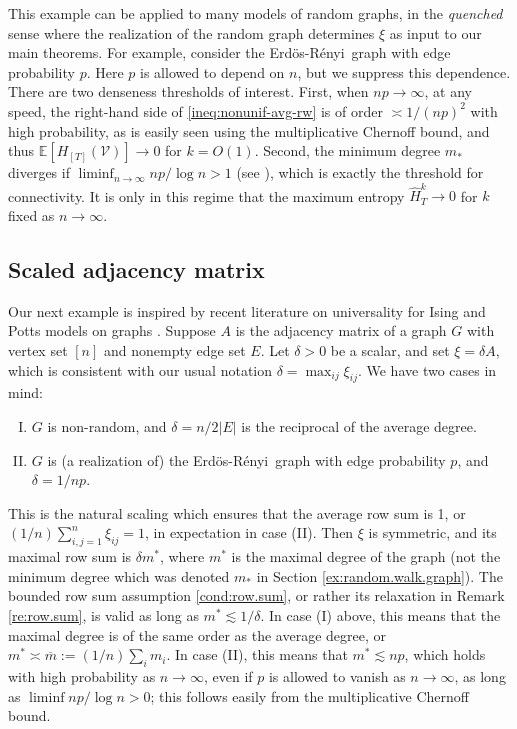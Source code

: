 \documentclass[11pt,reqno]{amsart}
\numberwithin{equation}{section}
\theoremstyle{definition}
\def\E{{\mathbb E}}
\def\V{{\mathcal V}}
\newcommand{\Erdos}{Erd\"{o}s-R\'enyi}
\begin{document}
This example can be applied to many models of random graphs, in the \emph{quenched} sense where the realization of the random graph determines $\xi$ as input to our main theorems.
For example, consider the \Erdos\ graph with edge probability $p$. Here $p$ is allowed to depend on $n$, but we suppress this dependence.
There are two denseness thresholds of interest. First, when $np\to\infty$, at any speed, the right-hand side of \eqref{ineq:nonunif-avg-rw} is of order $\asymp 1/(np)^2$ with high probability, as is easily seen using the multiplicative Chernoff bound, and thus  $ \E[H_{[T]}(\V)] \to 0$ for $k=O(1)$.
Second, the minimum degree $m_*$ diverges if  $\liminf_{n\to\infty} np/\log n > 1$ (see \cite[Lemma 6.5.2]{durrett2010random}), which is exactly the threshold for connectivity. It is only in this regime that the maximum entropy $\widehat{H}^k_T \to 0$ for $k$ fixed as $n\to\infty$. 



\subsection{Scaled adjacency matrix} \label{ex:AdjMatrix}
Our next example is inspired by recent literature on universality for Ising and Potts models on graphs \cite{basak2017universality}. Suppose $A$ is the adjacency matrix of a graph $G$ with vertex set $[n]$ and nonempty edge set $E$. Let $\delta > 0$ be a scalar, and set $\xi= \delta A$, which is consistent with our usual notation $ \delta = \max_{ij}\xi_{ij}$.
We have two cases in mind:
\begin{enumerate}[(I)]
\item $G$ is non-random, and $\delta=n/2|E|$ is the reciprocal of the average degree.
\item $G$ is (a realization of) the \Erdos\ graph with edge probability $p$, and $\delta = 1/np$.
\end{enumerate}
This is the natural scaling which ensures that the average row sum is 1, or $(1/n)\sum_{i,j=1}^n\xi_{ij}=1$, in expectation in case (II).
Then $\xi$ is symmetric, and its maximal row sum is $\delta m^*$, where $m^*$ is the maximal degree of the graph (not the minimum degree which was denoted $m_*$ in Section \ref{ex:random.walk.graph}).  The bounded row sum assumption \eqref{cond:row.sum}, or rather its relaxation in Remark \ref{re:row.sum}, is valid as long as $m^* \lesssim 1/\delta$. In case (I) above, this means that the maximal degree is of the same order as the average degree, or $m^* \asymp \overline{m} := (1/n)\sum_i m_i$. In case (II), this means that $m^* \lesssim np$, which holds with high probability as $n\to\infty$, even if $p$ is allowed to vanish as $n\to\infty$, as long as $\liminf np/\log n > 0$; this follows easily from the multiplicative Chernoff bound.
\end{document}
